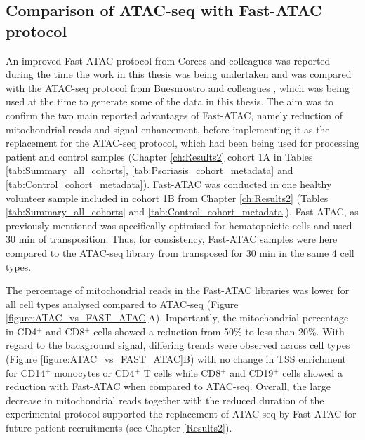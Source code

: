 \subsection{Comparison of ATAC-seq with Fast-ATAC protocol}
\label{Fast_ATAC}

An improved Fast-ATAC protocol from Corces and colleagues \parencite{Corces2016} was reported during the time the work in this thesis was being undertaken and was compared with the ATAC-seq protocol from Buesnrostro and colleagues \parencite{Buenrostro2013}, which was being used at the time to generate some of the data in this thesis. The aim was to confirm the two main reported advantages of Fast-ATAC, namely reduction of mitochondrial reads and signal enhancement, before implementing it as the replacement for the ATAC-seq protocol, which had been being used for processing patient and control samples (Chapter \ref{ch:Results2} cohort 1A in Tables \ref{tab:Summary_all_cohorts}, \ref{tab:Psoriasis_cohort_metadata} and \ref{tab:Control_cohort_metadata}). Fast-ATAC was conducted in one healthy volunteer sample included in cohort 1B from Chapter \ref{ch:Results2} (Tables \ref{tab:Summary_all_cohorts} and \ref{tab:Control_cohort_metadata}). Fast-ATAC, as previously mentioned was specifically optimised for hematopoietic cells and used 30 min of transposition. Thus, for consistency, Fast-ATAC samples were here compared to the ATAC-seq library from \label{ATACseq} transposed for 30 min in the same 4 cell types.

The percentage of mitochondrial reads in the Fast-ATAC libraries was lower for all cell types analysed compared to ATAC-seq (Figure \ref{figure:ATAC_vs_FAST_ATAC}A). Importantly, the mitochondrial percentage in CD4$^+$ and CD8$^+$ cells showed a reduction from 50\% to less than 20\%. With regard to the background signal, differing trends were observed across cell types (Figure \ref{figure:ATAC_vs_FAST_ATAC}B) with no change in TSS enrichment for CD14$^+$ monocytes or CD4$^+$ T cells while CD8$^+$ and CD19$^+$ cells showed a reduction with Fast-ATAC when compared to ATAC-seq. Overall, the large decrease in mitochondrial reads together with the reduced duration of the experimental protocol supported the replacement of ATAC-seq by Fast-ATAC for future patient recruitments (see Chapter \ref{Results2}). 



